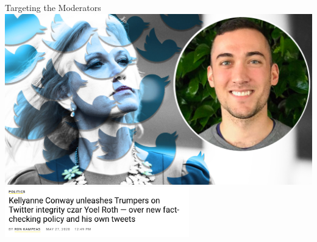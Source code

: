 \documentclass[nobackground,dvipsnames,table,aspectratio=169]{beamer}
\begin{document}
\begin{frame}{Targeting the Moderators}
    \includegraphics[height=0.6\textheight]{conway-roth}
    \centering
    \includegraphics[width=0.6\textwidth]{conway-roth-headline}
\end{frame}
\end{document}

